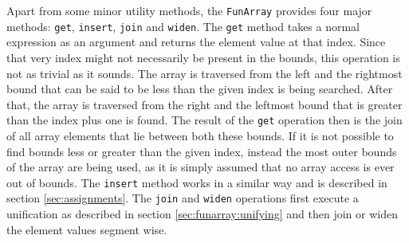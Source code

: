 Apart from some minor utility methods, the \texttt{FunArray} provides four major methods: \texttt{get}, \texttt{insert}, \texttt{join} and \texttt{widen}. The \texttt{get} method takes a normal expression as an argument and returns the element value at that index. Since that very index might not necessarily be present in the bounds, this operation is not as trivial as it sounds. The array is traversed from the left and the rightmost bound that can be said to be less than the given index is being searched. After that, the array is traversed from the right and the leftmost bound that is greater than the index plus one is found. The result of the \texttt{get} operation then is the join of all array elements that lie between both these bounds. If it is not possible to find bounds less or greater than the given index, instead the most outer bounds of the array are being used, as it is simply assumed that no array access is ever out of bounds. The \texttt{insert} method works in a similar way and is described in section \ref{sec:assignments}. 
The \texttt{join} and \texttt{widen} operations first execute a unification as described in section \ref{sec:funarray:unifying} and then join or widen the element values segment wise.

